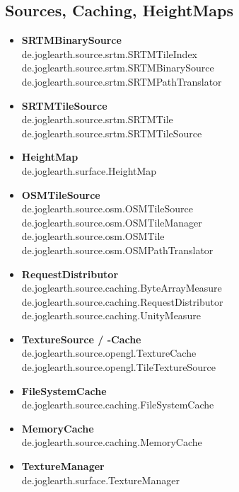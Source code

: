 \documentclass[10pt]{scrreprt}
\begin{document}
\subsection*{Sources, Caching, HeightMaps}
\begin{itemize}
\item \textbf{SRTMBinarySource}\\
de.joglearth.source.srtm.SRTMTileIndex\\
de.joglearth.source.srtm.SRTMBinarySource\\
de.joglearth.source.srtm.SRTMPathTranslator
\item \textbf{SRTMTileSource}\\
de.joglearth.source.srtm.SRTMTile\\
de.joglearth.source.srtm.SRTMTileSource
\item \textbf{HeightMap}\\
de.joglearth.surface.HeightMap
\item \textbf{OSMTileSource}\\
de.joglearth.source.osm.OSMTileSource\\
de.joglearth.source.osm.OSMTileManager\\
de.joglearth.source.osm.OSMTile\\
de.joglearth.source.osm.OSMPathTranslator
\item \textbf{RequestDistributor}\\
de.joglearth.source.caching.ByteArrayMeasure\\
de.joglearth.source.caching.RequestDistributor\\
de.joglearth.source.caching.UnityMeasure
\item \textbf{TextureSource / -Cache}\\
de.joglearth.source.opengl.TextureCache\\
de.joglearth.source.opengl.TileTextureSource
\item \textbf{FileSystemCache}\\
de.joglearth.source.caching.FileSystemCache
\item \textbf{MemoryCache}\\
de.joglearth.source.caching.MemoryCache
\item \textbf{TextureManager}\\
de.joglearth.surface.TextureManager
\end{itemize}

\vspace{5mm}
\end{document}
